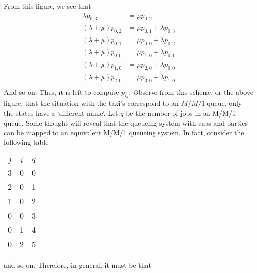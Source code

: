 \begin{question}
\begin{solution}
\begin{enumerate}
\begin{center}
      
    \end{center}

From this figure, we see that
\begin{align*}
\lambda p_{0,3} &= \mu p_{0,2} \\
(\lambda+\mu) p_{0,2} &= \mu p_{0,1} + \lambda p_{0,3}\\
(\lambda+\mu) p_{0,1} &= \mu p_{0,0} + \lambda p_{0,2}\\
(\lambda+\mu) p_{0,0} &= \mu p_{1,0} + \lambda p_{0,1}\\
(\lambda+\mu) p_{1,0} &= \mu p_{2,0} + \lambda p_{0,0}\\
(\lambda+\mu) p_{2,0} &= \mu p_{3,0} + \lambda p_{1,0}\\
\end{align*}
And so on. Thus, it is left to compute $p_{ij}$. Observe from this
scheme, or the above figure, that the situation with the taxi's
correspond to an $M/M/1$ queue, only the states have a `different
name'. Let $q$ be the number of jobs in an M/M/1 queue. Some thought
will reveal that the queueing system with cabs and parties can be
mapped to an equivalent M/M/1 queueing system. In fact, consider the
following table
\begin{center}
\begin{tabular}{ccc}
$j$ & $i$ & $q$\\
3&         0 &         0\\
2 &        0&          1\\
1 &        0&          2\\
0&         0&          3\\
0&         1&          4\\
0&         2&          5\\
\end{tabular}
\end{center}
and so on. Therefore, in general, it must be that 


\end{enumerate}
\end{solution}
\end{question}
